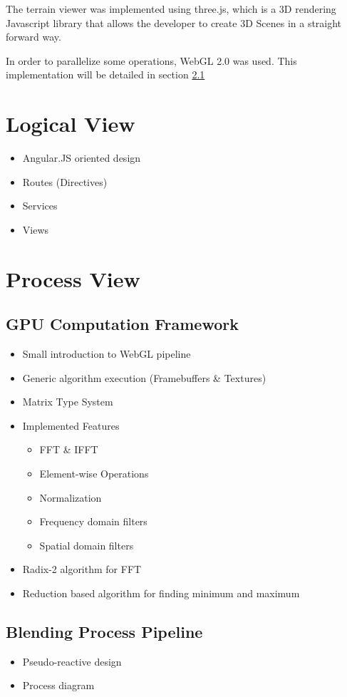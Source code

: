      The terrain viewer was implemented using three.js, which is a 3D rendering Javascript library that allows the developer to create 3D Scenes in a straight forward way. 
      
      In order to parallelize some operations, WebGL 2.0 was used. This implementation will be detailed in section \ref{sec:software:process:gpu}
    
  \section {Logical View} %
  
    \begin{itemize}
      \item Angular.JS oriented design
      \item Routes (Directives)
      \item Services
      \item Views
    \end{itemize}
    
  \section {Process View}
    
    \subsection {GPU Computation Framework} \label{sec:software:process:gpu} %
    
      \begin{itemize}
      	\item Small introduction to WebGL pipeline
      	\item Generic algorithm execution (Framebuffers \& Textures)
      	\item Matrix Type System
      	\item Implemented Features
      	  \begin{itemize}
      	  	\item FFT \& IFFT
      	  	\item Element-wise Operations
      	  	\item Normalization
      	  	\item Frequency domain filters
      	  	\item Spatial domain filters
      	  \end{itemize}
		\item Radix-2 algorithm for FFT
		\item Reduction based algorithm for finding minimum and maximum
      \end{itemize}
      
    \subsection {Blending Process Pipeline} %
    
      \begin{itemize}
      	\item Pseudo-reactive design
      	\item Process diagram
      \end{itemize}